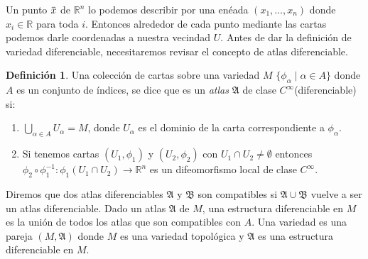 \documentclass{report}
\theoremstyle{definition}
\newtheorem{defi}[theorem]{Definici\'on}
\newcommand{\overbar}[1]{\mkern 1.5mu\overline{\mkern-1.5mu#1\mkern-1.5mu}\mkern 1.5mu}
\begin{document}
Un punto $\overbar{x}$ de $\mathbb{R}^n$ lo podemos describir por una en\'eada $(x_1, \dots , x_n)$ donde $x_i \in \mathbb{R}$ para toda $i$. Entonces alrededor de cada punto mediante las cartas podemos darle coordenadas a nuestra vecindad $U$. Antes de dar la definici\'on de variedad diferenciable, necesitaremos revisar el concepto de atlas diferenciable.

\begin{defi} Una colecci\'on de cartas sobre una variedad $M$ $ \{ \phi_\alpha \mid \alpha \in A \}$  donde $A$ es un conjunto de \'indices, se dice que es un \textit{atlas} $\mathfrak{A}$ de clase $C^\infty$(diferenciable) si: 

\begin{enumerate}

\item $\bigcup\limits_{\alpha \in A} U_\alpha = M$, donde $U_\alpha$ es el dominio de la carta correspondiente a $\phi_\alpha$. 

\item Si tenemos cartas $(U_1, \phi_1)$ y $(U_2, \phi_2)$ con $U_1 \cap U_2 \neq \emptyset$ entonces $\phi_2 \circ \phi_1^{-1}: \phi_1(U_1 \cap U_2) \to \mathbb{R}^n$ es un difeomorfismo local de clase $C^\infty$. 

\end{enumerate}
\end{defi}

Diremos que dos atlas diferenciables $\mathfrak{A}$ y $\mathfrak{B}$ son compatibles si $\mathfrak{A} \cup \mathfrak{B}$ vuelve a ser un atlas diferenciable. Dado un atlas $\mathfrak{A}$ de $M$, una estructura diferenciable en $M$ es la uni\'on de todos los atlas que son compatibles con $A$. Una variedad es una pareja $(M, \mathfrak{A} )$ donde $M$ es una variedad topol\'ogica y $\mathfrak{A}$ es una estructura diferenciable en $M$.
\end{document}

